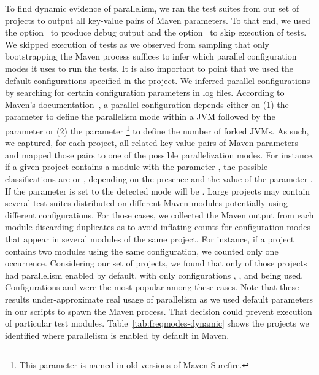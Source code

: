 To find dynamic evidence of parallelism, we ran the test suites from
our set of \numMedLong{} projects to output all key-value pairs of
Maven parameters.  To that end, we used the option~ to
produce debug output and the option~ to skip
execution of tests.  We skipped execution of tests as we observed from
sampling that only bootstrapping the Maven process suffices to infer
which parallel configuration modes it uses to run the
tests.  It is also important to point that we used the default
configurations specified in the project.  We inferred parallel
configurations by searching for certain configuration parameters in
log files. According to Maven's
documentation~\cite{maven-surefire-plugin}, a parallel configuration
depends either on (1) the parameter  to define the
parallelism mode within a JVM followed by the parameter
 or (2) the parameter
\footnote{This parameter is named 
  in old versions of Maven Surefire.} to define the number of forked
JVMs.  As such, we captured, for each project, all related key-value
pairs of Maven parameters and mapped those pairs to one of the
possible parallelization modes.  For instance, if a given project
contains a module with the parameter
, the possible classifications are
\ForkSeq{} or \ForkParMeth{}, depending on the presence and the value
of the parameter .  If the parameter
 is set to  the detected mode will be
\ForkParMeth{}.  Large projects may contain several test suites
distributed on different Maven modules potentially using different
configurations.  For those cases, we collected the Maven output from
each module discarding duplicates as to avoid inflating counts for
configuration modes that appear in several modules of the same
project. For instance, if a project contains two modules using the
same configuration, we counted only one occurrence.
Considering
our set of \numMedLong{} projects, we found that only
\numProjectsPar{} of those projects had parallelism enabled
by default, with only configurations \ParClassSeqMeth{},
\ParClassParMeth{}, and \ForkSeq{} being used. Configurations
\ParClassParMeth{} and \ForkSeq{} were the most popular among these
cases. Note that these results under-approximate real usage of
parallelism as we used default parameters in our scripts to spawn the
Maven process.  That decision could prevent execution of particular
test modules. Table~\ref{tab:freqmodes-dynamic} shows the
\numProjectsPar{} projects we identified where parallelism is enabled by default in Maven.

